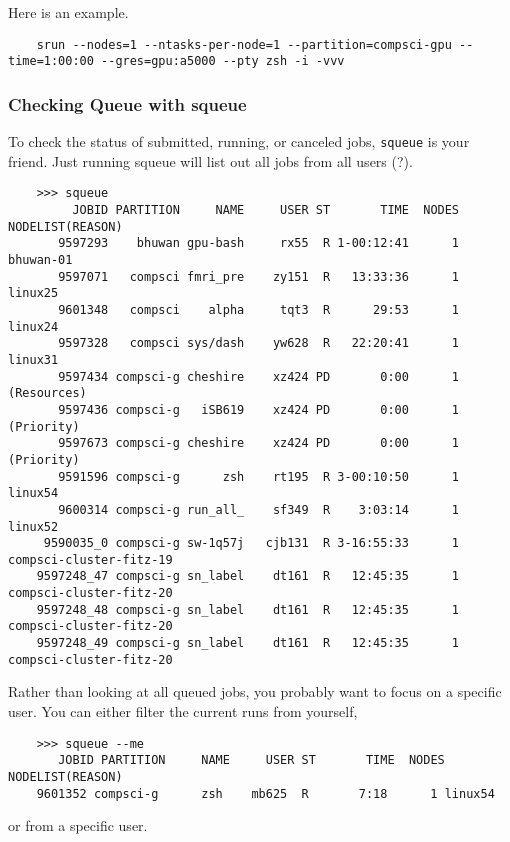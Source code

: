   Here is an example. 
  \begin{lstlisting}
    srun --nodes=1 --ntasks-per-node=1 --partition=compsci-gpu --time=1:00:00 --gres=gpu:a5000 --pty zsh -i -vvv
  \end{lstlisting}

  
\subsubsection{Checking Queue with squeue}

  To check the status of submitted, running, or canceled jobs, \texttt{squeue} is your friend. Just running squeue will list out all jobs from all users (?).  

  \begin{lstlisting}
    >>> squeue           
         JOBID PARTITION     NAME     USER ST       TIME  NODES NODELIST(REASON)
       9597293    bhuwan gpu-bash     rx55  R 1-00:12:41      1 bhuwan-01
       9597071   compsci fmri_pre    zy151  R   13:33:36      1 linux25
       9601348   compsci    alpha     tqt3  R      29:53      1 linux24
       9597328   compsci sys/dash    yw628  R   22:20:41      1 linux31
       9597434 compsci-g cheshire    xz424 PD       0:00      1 (Resources)
       9597436 compsci-g   iSB619    xz424 PD       0:00      1 (Priority)
       9597673 compsci-g cheshire    xz424 PD       0:00      1 (Priority)
       9591596 compsci-g      zsh    rt195  R 3-00:10:50      1 linux54
       9600314 compsci-g run_all_    sf349  R    3:03:14      1 linux52
     9590035_0 compsci-g sw-1q57j   cjb131  R 3-16:55:33      1 compsci-cluster-fitz-19
    9597248_47 compsci-g sn_label    dt161  R   12:45:35      1 compsci-cluster-fitz-20
    9597248_48 compsci-g sn_label    dt161  R   12:45:35      1 compsci-cluster-fitz-20
    9597248_49 compsci-g sn_label    dt161  R   12:45:35      1 compsci-cluster-fitz-20 
  \end{lstlisting} 

  Rather than looking at all queued jobs, you probably want to focus on a specific user. You can either filter the current runs from yourself, 

  \begin{lstlisting}
    >>> squeue --me      
       JOBID PARTITION     NAME     USER ST       TIME  NODES NODELIST(REASON)
    9601352 compsci-g      zsh    mb625  R       7:18      1 linux54 
  \end{lstlisting}

  or from a specific user. 

